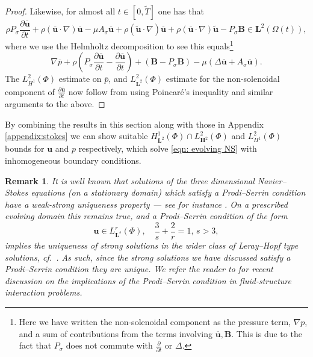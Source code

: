 \documentclass[a4paper]{amsart}
\numberwithin{equation}{section}
\newcommand{\ddt}[1]{\frac{\partial #1}{\partial t}}
\newcommand{\grad}{\nabla}
\theoremstyle{plain}
\newtheorem{remark}[theorem]{Remark}
\newcommand{\mbf}[1]{\mathbf{#1}}
\begin{document}
\begin{proof}
	Likewise, for almost all $t \in [0,\widetilde{T}]$ one has that 
     \[\rho P_\sigma \ddt{\overline{\mbf{u}}} + \rho(\overline{\mbf{u}} \cdot \grad) \overline{\mbf{u}} - \mu A_{\sigma} \overline{\mbf{u}} + \rho (\widetilde{\mbf{u}} \cdot \grad)\overline{\mbf{u}} + \rho(\overline{\mbf{u}} \cdot \grad) \widetilde{\mbf{u}} - P_\sigma \mbf{B} \in \mbf{L}^2(\Omega(t)),\]
    where we use the Helmholtz decomposition to see this equals\footnote{Here we have written the non-solenoidal component as the pressure term, $\grad p$, and a sum of contributions from the terms involving $\overline{\mbf{u}}, \mbf{B}$.
    This is due to the fact that $P_\sigma$ does not commute with $\ddt{}$ or $\Delta$.}
    \[\grad \overline{p} + \rho\left(P_\sigma \ddt{\overline{\mbf{u}}} - \ddt{\overline{\mbf{u}}}\right) + (\mbf{B} - P_\sigma\mbf{B}) - \mu(\Delta \overline{\mbf{u}} + A_{\sigma}\overline{\mbf{u}}).\]
	The $L^2_{H^1}(\Phi)$ estimate on $\overline{p}$, and $L^2_{\mbf{L}^2}(\Phi)$ estimate for the non-solenoidal component of $\ddt{\overline{\mbf{u}}}$ now follow from using Poincar\'e's inequality and similar arguments to the above.
\end{proof}

By combining the results in this section along with those in Appendix \ref{appendix:stokes} we can show suitable $H^1_{\mbf{L}^2}(\Phi) \cap L^2_{\mbf{H}^2}(\Phi)$ and $L^2_{H^1}(\Phi)$ bounds for $\mbf{u}$ and $p$ respectively, which solve \eqref{eqn: evolving NS} with inhomogeneous boundary conditions.

\begin{remark}
\label{remark: eqn: evolving NS uniqueness}
It is well known that solutions of the three dimensional Navier--Stokes equations (on a stationary domain) which satisfy a Prodi--Serrin condition \cite{prodi1959teorema, serrin1962interior} have a weak-strong uniqueness property --- see for instance \cite[Theorem 8.19]{robinson2016three}.
On a prescribed evolving domain this remains true, and a Prodi--Serrin condition of the form
\[ \mbf{u} \in L^r_{\mbf{L}^s}(\Phi), \quad \frac{3}{s} + \frac{2}{r} = 1, \, s > 3,\]
implies the uniqueness of strong solutions in the wider class of Leray--Hopf type solutions, cf.~\cite{Bock77NavierStokes,salvi1988navier}.
As such, since the strong solutions we have discussed satisfy a Prodi--Serrin condition they are unique.
We refer the reader to \cite{maity2024uniqueness,maity2025regularity,muha2021uniqueness} for recent discussion on the implications of the Prodi--Serrin condition in fluid-structure interaction problems.
\end{remark}
\end{document}
